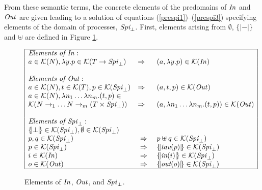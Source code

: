 \documentclass[10pt,a4paper,final,oneside,fleqn]{book}
\begin{document}
From these semantic terms, the concrete elements of the predomains of $\mbox{{\itshape In\/}}$ and $\mbox{{\itshape Out\/}}$ are given leading to a solution of equations (\ref{prespi1})--(\ref{prespi3}) specifying elements of the domain of processes, $\mbox{{\itshape Spi}}_\bot$.  First, elements arising from $\emptyset$, $\{\!|-|\!\}$ and $\uplus$ are defined in Figure \ref{simplespi}.
\begin{figure}[!tbp]
\begin{center}
$\begin{array}{|lll|}\hline
\mbox{{\itshape Elements of In\/}}:&&\\
a\in\mathcal{K}(N),\lambda y.p\in\mathcal{K}(T\to\mbox{{\itshape Spi\/}}_\bot)&\Rightarrow&(a,\lambda y.p)\in\mathcal{K}(\mbox{{\itshape In\/}})\\&&\\
\mbox{{\itshape Elements of Out\/}}:&&\\
a\in\mathcal{K}(N),t\in\mathcal{K}(T),p\in\mathcal{K}(\mbox{{\itshape Spi\/}}_\bot)&\Rightarrow&(a,t,p)\in\mathcal{K}(\mbox{{\itshape Out\/}})\\
a\in\mathcal{K}(N),\lambda n_1\ldots\lambda n_m.(t,p)\in&&\\
\mathcal{K}(N\to_1\ldots N\to_m(T\times\mbox{{\itshape Spi\/}}_\bot))&\Rightarrow&(a, \lambda n_1\ldots\lambda n_m.(t,p))\in\mathcal{K}(\mbox{{\itshape Out\/}})\\&&\\
\mbox{{\itshape Elements of Spi\/}}_\bot:&&\\
\{\!|\bot|\!\}\in\mathcal{K}(\mbox{{\itshape Spi\/}}_\bot),
\emptyset\in\mathcal{K}(\mbox{{\itshape Spi\/}}_\bot)&&\\
p,q\in\mathcal{K}(\mbox{{\itshape Spi\/}}_\bot)&~\Rightarrow~&p\uplus q\in\mathcal{K}(\mbox{{\itshape Spi\/}}_\bot)\\
p\in\mathcal{K}(\mbox{{\itshape Spi\/}}_\bot)&~\Rightarrow~&\{\!|\mbox{{\itshape tau}}(p)|\!\}\in\mathcal{K}(\mbox{{\itshape Spi\/}}_\bot)\\
i\in\mathcal{K}(\mbox{{\itshape In\/}})&~\Rightarrow~&\{\!|\mbox{{\itshape in}}(i)|\!\}\in\mathcal{K}(\mbox{{\itshape Spi\/}}_\bot)\\
o\in\mathcal{K}(\mbox{{\itshape Out\/}})&~\Rightarrow~&\{\!|\mbox{{\itshape out}}(o)|\!\}\in\mathcal{K}(\mbox{{\itshape Spi\/}}_\bot)\\
\hline
\end{array}$
\end{center}
\caption{Elements of $\mbox{{\itshape In\/}}$, $\mbox{{\itshape Out\/}}$, and $\mbox{{\itshape Spi\/}}_\bot$.\label{simplespi}}
\end{figure}
\end{document}
